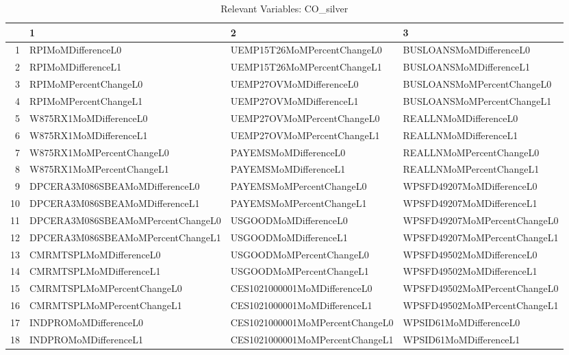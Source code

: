\begin{longtable}{rlll}
\caption{Relevant Variables: CO_silver} \\ 
  \hline
 & 1 & 2 & 3 \\ 
  \hline
1 & RPIMoMDifferenceL0 & UEMP15T26MoMPercentChangeL0 & BUSLOANSMoMDifferenceL0 \\ 
  2 & RPIMoMDifferenceL1 & UEMP15T26MoMPercentChangeL1 & BUSLOANSMoMDifferenceL1 \\ 
  3 & RPIMoMPercentChangeL0 & UEMP27OVMoMDifferenceL0 & BUSLOANSMoMPercentChangeL0 \\ 
  4 & RPIMoMPercentChangeL1 & UEMP27OVMoMDifferenceL1 & BUSLOANSMoMPercentChangeL1 \\ 
  5 & W875RX1MoMDifferenceL0 & UEMP27OVMoMPercentChangeL0 & REALLNMoMDifferenceL0 \\ 
  6 & W875RX1MoMDifferenceL1 & UEMP27OVMoMPercentChangeL1 & REALLNMoMDifferenceL1 \\ 
  7 & W875RX1MoMPercentChangeL0 & PAYEMSMoMDifferenceL0 & REALLNMoMPercentChangeL0 \\ 
  8 & W875RX1MoMPercentChangeL1 & PAYEMSMoMDifferenceL1 & REALLNMoMPercentChangeL1 \\ 
  9 & DPCERA3M086SBEAMoMDifferenceL0 & PAYEMSMoMPercentChangeL0 & WPSFD49207MoMDifferenceL0 \\ 
  10 & DPCERA3M086SBEAMoMDifferenceL1 & PAYEMSMoMPercentChangeL1 & WPSFD49207MoMDifferenceL1 \\ 
  11 & DPCERA3M086SBEAMoMPercentChangeL0 & USGOODMoMDifferenceL0 & WPSFD49207MoMPercentChangeL0 \\ 
  12 & DPCERA3M086SBEAMoMPercentChangeL1 & USGOODMoMDifferenceL1 & WPSFD49207MoMPercentChangeL1 \\ 
  13 & CMRMTSPLMoMDifferenceL0 & USGOODMoMPercentChangeL0 & WPSFD49502MoMDifferenceL0 \\ 
  14 & CMRMTSPLMoMDifferenceL1 & USGOODMoMPercentChangeL1 & WPSFD49502MoMDifferenceL1 \\ 
  15 & CMRMTSPLMoMPercentChangeL0 & CES1021000001MoMDifferenceL0 & WPSFD49502MoMPercentChangeL0 \\ 
  16 & CMRMTSPLMoMPercentChangeL1 & CES1021000001MoMDifferenceL1 & WPSFD49502MoMPercentChangeL1 \\ 
  17 & INDPROMoMDifferenceL0 & CES1021000001MoMPercentChangeL0 & WPSID61MoMDifferenceL0 \\ 
  18 & INDPROMoMDifferenceL1 & CES1021000001MoMPercentChangeL1 & WPSID61MoMDifferenceL1 \\ 

\end{longtable}
